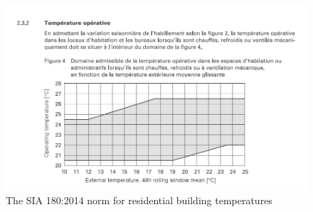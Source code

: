 \begin{figure}[ht]
    \centering
    \includegraphics[width = \textwidth]{Images/sia_180_2014_en.png}
    \caption{The SIA 180:2014 norm for residential building
    temperatures~\cite{sia180:2014ProtectionThermiqueProtection2014}}
    \label{fig:sia_temperature_norm}
\end{figure}

\clearpage
